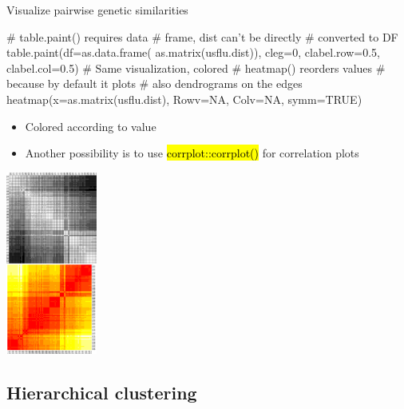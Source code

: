 \documentclass[compress, ucs, xelatex, 11pt, xcolor=svgnames,
  hyperref={
    bookmarks=true,
    unicode=true,
    colorlinks=true,
    pdftitle={Molecular data in R},
    plainpages=false,
    pdfauthor={Vojtech Zeisek},
    pdfsubject={Course about phylogeny and evolution in R},
    pdfcreator={XeLaTeX},
    pdfkeywords={R, evolution, phylogeny, molecular data},
    linkcolor=Tomato,
    anchorcolor=SaddleBrown,
    citecolor=Goldenrod,
    filecolor=DarkMagenta,
    menucolor=Sienna,
    urlcolor=DarkTurquoise,
    pdftex},
  url={hyphens, lowtilde} %
  ]{beamer}
\renewcommand{\texttt}[1]{\hl{\ttfamily #1}}
\begin{document}
\begin{frame}[fragile]{Visualize pairwise genetic similarities}
\begin{multicols}{2}
\vfil
  \begin{spluscode}
    # table.paint() requires data
    # frame, dist can't be directly
    # converted to DF
    table.paint(df=as.data.frame(
      as.matrix(usflu.dist)), cleg=0,
      clabel.row=0.5, clabel.col=0.5)
    # Same visualization, colored
    # heatmap() reorders values
    # because by default it plots
    # also dendrograms on the edges
    heatmap(x=as.matrix(usflu.dist),
      Rowv=NA, Colv=NA, symm=TRUE)
  \end{spluscode}
\begin{itemize}
 \item Colored according to value
 \item Another possibility is to use \texttt{corrplot::corrplot()} for correlation plots
\end{itemize}
  \columnbreak
  \begin{center}
    \includegraphics[height=6cm]{dna-dists.png}
  \end{center}
\end{multicols}
\end{frame}

\subsection{Hierarchical clustering}
\end{document}
